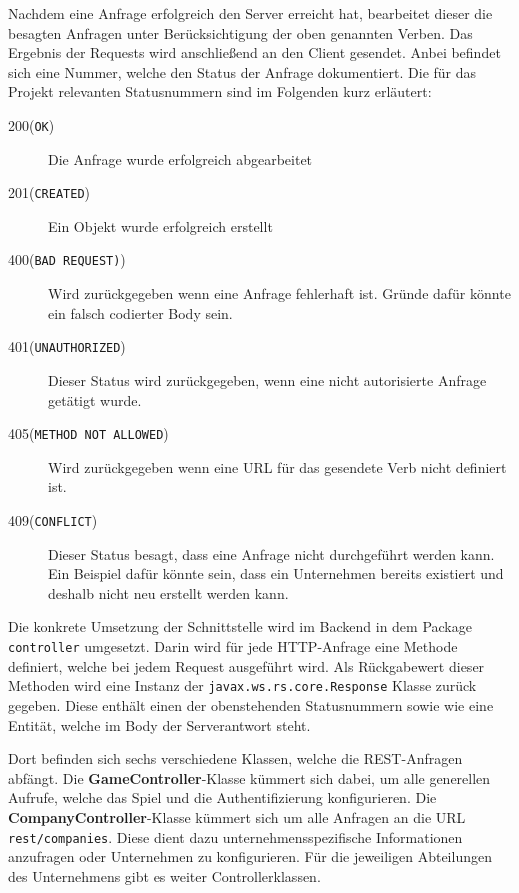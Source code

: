 Nachdem eine Anfrage erfolgreich den Server erreicht hat, bearbeitet dieser die besagten Anfragen unter Berücksichtigung der oben genannten Verben. Das Ergebnis der Requests wird anschließend an den Client gesendet. Anbei befindet sich eine Nummer, welche den Status der Anfrage dokumentiert. Die für das Projekt relevanten Statusnummern sind im Folgenden kurz erläutert:


\begin{description}
	\item[200(\texttt{OK})] Die Anfrage wurde erfolgreich abgearbeitet
	\item[201(\texttt{CREATED})] Ein Objekt wurde erfolgreich erstellt
	
	\item[400(\texttt{BAD REQUEST)})] Wird zurückgegeben wenn eine Anfrage fehlerhaft ist. Gründe dafür könnte ein falsch codierter Body sein.
	\item[401(\texttt{UNAUTHORIZED})] Dieser Status wird zurückgegeben, wenn eine nicht autorisierte Anfrage getätigt wurde.
	\item[405(\texttt{METHOD NOT ALLOWED})] Wird zurückgegeben wenn eine URL für das gesendete Verb nicht definiert ist.
	\item[409(\texttt{CONFLICT})] Dieser Status besagt, dass eine Anfrage nicht durchgeführt werden kann. Ein Beispiel dafür könnte sein, dass ein Unternehmen bereits existiert und deshalb nicht neu erstellt werden kann.
\end{description}

Die konkrete Umsetzung der Schnittstelle wird im Backend in dem Package \texttt{controller} umgesetzt. 
Darin wird für jede \ac{HTTP}-Anfrage eine Methode definiert, welche bei jedem Request ausgeführt wird.
Als Rückgabewert dieser Methoden wird eine Instanz der \texttt{javax.ws.rs.core.Response} Klasse zurück gegeben.
Diese enthält einen der obenstehenden Statusnummern sowie wie eine Entität, welche im Body der Serverantwort steht.


Dort befinden sich sechs verschiedene Klassen, welche die \ac{REST}-Anfragen abfängt. Die \textbf{GameController}-Klasse kümmert sich dabei, um alle generellen Aufrufe, welche das Spiel und die Authentifizierung konfigurieren.
Die \textbf{CompanyController}-Klasse kümmert sich um alle Anfragen an die URL \texttt{rest/companies}. Diese dient dazu unternehmensspezifische Informationen anzufragen oder Unternehmen zu konfigurieren. Für die jeweiligen Abteilungen des Unternehmens gibt es weiter Controllerklassen. 


